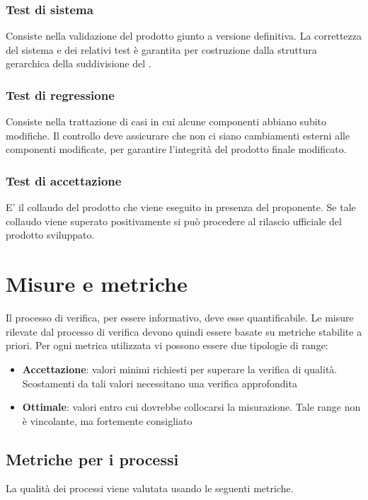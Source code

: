 \documentclass[12pt,a4paper]{article}
\begin{document}
\subsubsection{Test di sistema}
Consiste nella validazione del prodotto giunto a versione definitiva. La correttezza del sistema e dei relativi test è garantita per costruzione dalla struttura gerarchica della suddivisione del .
\subsubsection{Test di regressione}
Consiste nella trattazione di casi in cui alcune componenti abbiano subito modifiche. Il controllo deve assicurare che non ci siano cambiamenti esterni alle componenti modificate, per garantire l'integrità del prodotto finale modificato.
\subsubsection{Test di accettazione}
E' il collaudo del prodotto  che viene eseguito in presenza del proponente. Se tale collaudo viene superato positivamente si può procedere al rilascio ufficiale del prodotto sviluppato. 

\newpage
\section{Misure e metriche}\label{metriche}
Il processo di verifica, per essere informativo, deve esse quantificabile. Le misure rilevate dal processo di verifica devono quindi essere basate su metriche stabilite a priori. Per ogni metrica utilizzata vi possono essere due tipologie di range:
\begin{itemize}
\item \textbf{Accettazione}: valori minimi richiesti per superare la verifica di qualità. Scostamenti da tali valori necessitano una verifica approfondita
\item \textbf{Ottimale}: valori entro cui dovrebbe collocarsi la misurazione. Tale range non è vincolante, ma fortemente consigliato
\end{itemize}
\subsection{Metriche per i processi}\label{metriche_processi}
La qualità dei processi viene valutata usando le seguenti metriche.
\end{document}
